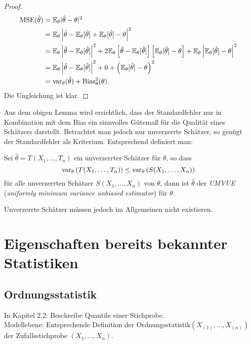 \begin{proof}
  \begin{align*}
    \operatorname*{MSE}(\hat{\theta})
    &= \mathbb{E}_\theta|\hat{\theta}-\theta|^2 \\
    &= \mathbb{E}_\theta \left| \hat{\theta} - \mathbb{E}_\theta[\hat{\theta}]
      + \mathbb{E}_\theta[\hat{\theta}] - \theta \right|^2 \\
    &= \mathbb{E}_\theta \left| \hat{\theta} - \mathbb{E}_\theta[\hat{\theta}] \right|^2
      + 2 \mathbb{E}_\theta
      \left[ \hat{\theta} - \mathbb{E}_\theta[\hat{\theta}]\right]
      \left[ \mathbb{E}_\theta[\hat{\theta}] - \theta \right]
      + \mathbb{E}_\theta \left| \mathbb{E}_\theta[\hat{\theta}] - \theta \right|^2 \\
    &= \mathbb{E}_\theta \left| \hat{\theta} - \mathbb{E}_\theta[\hat{\theta}] \right|^2
      + 0 + \left( \mathbb{E}_\theta[\hat{\theta}] - \theta \right)^2 \\
    &= \operatorname{var}_\theta(\hat{\theta}) + \operatorname{Bias}_\theta^2 (\theta).
  \end{align*}
  Die Ungleichung ist klar.
\end{proof}

Aus dem obigen Lemma wird ersichtlich, dass der Standardfehler nur in
Kombination mit dem Bias ein sinnvolles Gütemaß für die Qualität eines Schätzers
darstellt. Betrachtet man jedoch nur unverzerrte Schätzer, so genügt der
Standardfehler als Kriterium. Entsprechend definiert man:

\begin{defn}
Sei $\hat{\theta} = T(X_1, \ldots, T_n)$ ein unverzerrter Schätzer für $\theta$,
so dass 
\[ \operatorname{var}_\theta \left( T(X_1, \ldots, T_n) \right) \le
  \operatorname{var}_\theta \left( S(X_1, \ldots, X_n) \right) \]
für alle unverzerrten Schätzer $S(X_1, \ldots, X_n)$ von $\theta$, dann ist
$\hat{\theta}$ der \emph{UMVUE} (\emph{uniformly minimum variance unbiased
  estimator}) für $\theta$.
\end{defn}

Unverzerrte Schätzer müssen jedoch im Allgemeinen nicht existieren.

\clearpage

\section{Eigenschaften bereits bekannter Statistiken}
\subsection{Ordnungsstatistik}
In Kapitel 2.2: Beschreibe Quantile einer Stichprobe. \\
Modellebene: Entsprechende Definition der Ordnungsstatistik$(X_{(1)}, \ldots,
X_{(n)})$ der Zufallsstichprobe $(X_1, \ldots, X_n)$.

